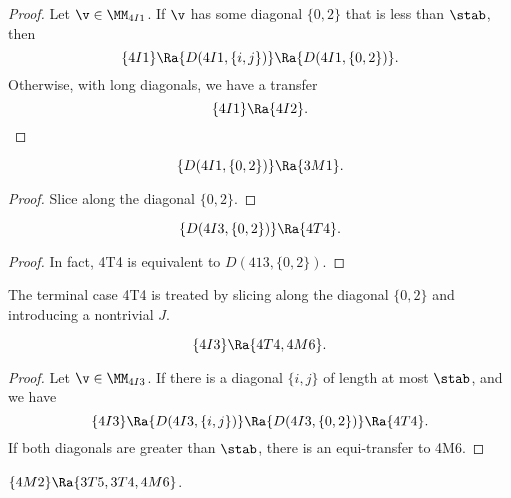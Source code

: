 \begin{proof}  Let $\v\in \MM_{4I1}$.  If $\v$ has some diagonal $\{0,2\}$ that is less than $\stab$,
then
\[
\{4I1\}\Ra\{D(4I1,\{i,j\})\}\Ra\{D(4I1,\{0,2\})\}.
\]
Otherwise, with long diagonals, we have a transfer
\[
\{4I1\}\Ra \{4I2\}.
\]
\end{proof}

\begin{lemma}[]
\[
\{D(4I1,\{0,2\})\}\Ra \{3M1\}.
\]
\end{lemma}

\begin{proof}
Slice along the diagonal $\{0,2\}$.
\end{proof}

\begin{lemma}[]
\[
\{D(4I3,\{0,2\})\}\Ra \{4T4\}.
\]
\end{lemma}

\begin{proof}
In fact,  4T4 is equivalent to $D(413,\{0,2\})$.
\end{proof}

\begin{remark}  The terminal case 4T4 is treated by slicing along the diagonal $\{0,2\}$ and introducing
a nontrivial $J$.
\end{remark}

\begin{lemma}[]
\[
\{4I3\}\Ra\{4T4,4M6\}.
\]
\end{lemma}

\begin{proof}
Let $\v\in \MM_{4I3}$.  
If there is a diagonal $\{i,j\}$ of length at most $\stab$, and we have
\[
\{4I3\}\Ra\{D(4I3,\{i,j\})\}\Ra \{D(4I3,\{0,2\})\} \Ra\{4T4\}.
\]
If both diagonals are greater than $\stab$, there is an equi-transfer to 4M6.
\end{proof}



\begin{lemma}[]
$\{4M2\}\Ra\{3T5,3T4,4M6\}$.
\end{lemma}

